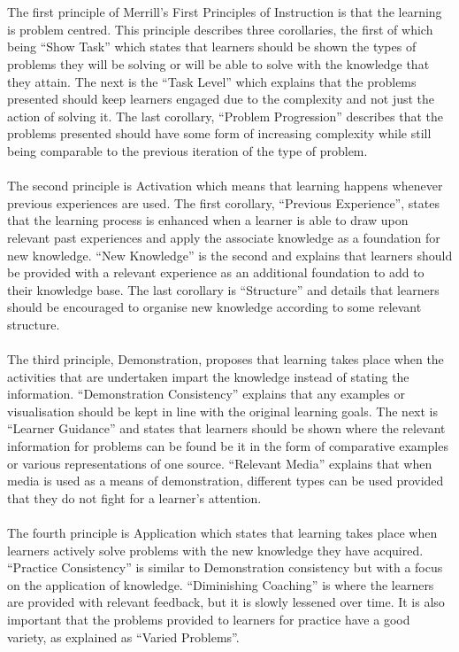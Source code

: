 \documentclass[conference]{IEEEtran}
\begin{document}
\\\\
The first principle of Merrill’s First Principles of Instruction is that the learning is problem centred. This principle describes three corollaries, the first of which being “Show Task” which states that learners should be shown the types of problems they will be solving or will be able to solve with the knowledge that they attain\cite{Merrill2002}. The next is the “Task Level” which explains that the problems presented should keep learners engaged due to the complexity and not just the action of solving it\cite{Merrill2002}. The last corollary, “Problem Progression” describes that the problems presented should have some form of increasing complexity while still being comparable to the previous iteration of the type of problem\cite{Merrill2002}.
\\\\
The second principle is Activation which means that learning happens whenever previous experiences are used\cite{Merrill2002}. The first corollary, “Previous Experience”, states that the learning process is enhanced when a learner is able to draw upon relevant past experiences and apply the associate knowledge as a foundation for new knowledge\cite{Merrill2002}. “New Knowledge” is the second and explains that learners should be provided with a relevant experience as an additional foundation to add to their knowledge base\cite{Merrill2002}. The last corollary is “Structure” and details that learners should be encouraged to organise new knowledge according to some relevant structure\cite{Merrill2002}.
\\\\
The third principle, Demonstration, proposes that learning takes place when the activities that are undertaken impart the knowledge instead of stating the information\cite{Merrill2002}. “Demonstration Consistency” explains that any examples or visualisation should be kept in line with the original learning goals\cite{Merrill2002}. The next is “Learner Guidance” and states that learners should be shown where the relevant information for problems can be found be it in the form of comparative examples or various representations of one source\cite{Merrill2002}. “Relevant Media” explains that when media is used as a means of demonstration, different types can be used provided that they do not fight for a learner’s attention\cite{Merrill2002}.
\\\\
The fourth principle is Application which states that learning takes place when learners actively solve problems with the new knowledge they have acquired\cite{Merrill2002}. “Practice Consistency” is similar to Demonstration consistency but with a focus on the application of knowledge\cite{Merrill2002}. “Diminishing Coaching” is where the learners are provided with relevant feedback, but it is slowly lessened over time\cite{Merrill2002}. It is also important that the problems provided to learners for practice have a good variety, as explained as “Varied Problems”\cite{Merrill2002}.
\end{document}
